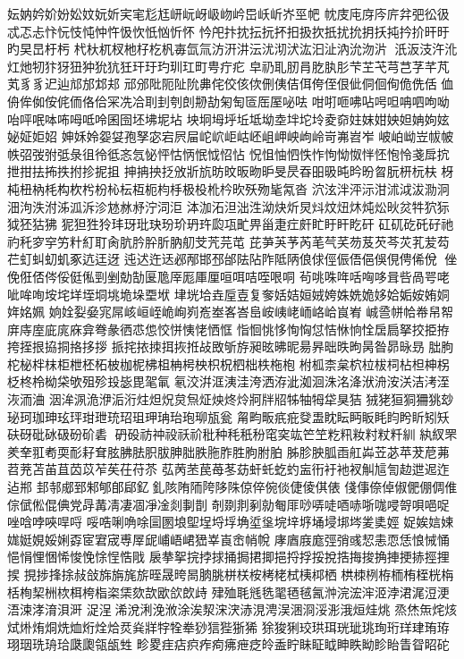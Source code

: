 妘妠妗妎妢妐妏妧妡宎宒尨尪岍岏岈岋岉岒岊岆岓岕巠帊
帎庋庉庌庈庍弅弝彸彶忒忑忐忭忨忮忳忡忤忣忺忯忷忻怀
忴戺抃抌抎抏抔抇扱扻扺扰抁抈扷扽扲扴旰旴旳旲旵杅杇
杙杕杌杈杝杍杚杋毐氙氚汸汧汫沄沋沏汱汯汩沚汭沇沕沜
汦汳汥汻沎灴灺牣犿犽狃狆狁犺狅玕玗玓玔玒町甹疔疕
皁礽耴肕肙肐肒肜芐芏芅芎芑芓芊芃芄⾘豸迉辿邟邡邥邞
邧邠阰阨阯阭丳侘佼侅佽侀侇佶佴侉侄佷佌侗佪侚佹侁佸
侐侜侔侞侒侂侕佫佮冞冼冾刵刲刳剆刱劼匊匋匼厒厔咇呿
咁咑咂咈呫呺呾呥呬呴呦咍呯呡呠咘呣呧呤囷囹坯坲坭坫
坱坰坶垀坵坻坳坴坢坨坽夌奅妵妺姏姎妲姌姁妶妼姃姖妱
妽姀姈妴姇孢孥宓宕屄屇岮岤岠岵岯岨岬岟岣岭岢岪岧岝
岥岶岰岦帗帔帙弨弢弣弤彔徂彾彽忞忥怭怦怙怲怋怴怊怗
怳怚怞怬怢怍怐怮怓怑怌怉怜戔戽抭抴拑抾抪抶拊抮抳抯
抻抩抰抸攽斨斻昉旼昄昒昈旻昃昋昍昅旽昑昐曶朊枅杬枎
枒杶杻枘枆构杴枍枌杺枟枑枙枃杽极杸杹枔欥殀歾毞氝沓
泬泫泮泙沶泔沭泧沷泐泂沺泃泆泭泲泒泝沴沊沝沀泞泀洰
泍泇沰泹泏泩泑炔炘炅炓炆炄炑炖炂炚炃牪狖狋狘狉狜狒
狔狚狌狑玤玡玭玦玢玠玬玝瓝瓨甿畀甾疌疘皯盳盱盰盵矸
矼矹矻矺矷祂礿秅穸穻竻籵糽耵肏肮肣肸肵肭舠芠苀芫芚
芘芛芵芧芮芼芞芺芴芨芡芩苂芤苃芶芢虰虯虭虮豖迒迋迓
迍迖迕迗邲邴邯邳邰阹阽阼阺陃俍俅俓侲俉俋俁俔俜俙侻
侳俛俇俖侺俀侹俬剄剉勀勂匽卼厗厖厙厘咺咡咭咥哏哃
茍咷咮哖咶哅哆咠呰咼咢咾呲哞咰垵垞垟垤垌垗垝垛垔垘
垏垙垥垚垕壴复奓姡姞姮娀姱姝姺姽姼姶姤姲姷姛姩姳姵
姠姾姴姭宨屌峐峘峌峗峋峛峞峚峉峇峊峖峓峔峏峈峆峎峟
峸巹帡帢帣帠帤庰庤庢庛庣庥弇弮彖徆怷怹恔恲恞恅恓恇
恉恛恌恀恂恟怤恄恘恦恮扂扃拏挍挋拵挎挃拫拹挏挌拸拶
挀挓挔拺挕拻拰敁敃斪斿昶昡昲昵昜昦昢昳昫昺昝昴昹昮
朏朐柁柲柈枺柜枻柸柘柀枷柅柫柤柟枵柍枳柷柶柮柣柂枹
柎柧柰枲柼柆柭柌枮柦柛柺柉柊柃柪柋欨殂殄殶毖毘毠氠
氡洨洴洭洟洼洿洒洊泚洳洄洙洺洚洑洀洝浂洁洘洷洃洏浀
洇洠洬洈洢洉洐炷炟炾炱炰炡炴炵炩牁牉牊牬牰牳牮狊狤
狨狫狟狪狦狣玅珌珂珈珅玹玶玵玴珫玿珇玾珃珆玸珋瓬瓮
甮畇畈疧疪癹盄眈眃眄眅眊盷盻盺矧矨砆砑砒砅砐砏砎砉
砃砓祊祌祋祅祄秕种秏秖秎窀穾竑笀笁籺籸籹籿粀粁紃
紈紁罘羑羍羾耇耎耏耔耷胘胇胠胑胈胂胐胅胣胙胜胊胕胉
胏胗胦胍臿舡芔苙苾苹茇苨茀苕茺苫苖苴苬苡苲苵茌苻苶
苰苪苤苠苺苳苭虷虴虼虳衁衎衧衪衩觓訄訇赲迣迡迮迠郱
邽邿郕郅邾郇郋郈釔釓陔陏陑陓陊陎倞倅倇倓倢倰倛俵
俴倳倷倬俶俷倗倜倠倧倵倯倱倎党冔冓凊凄凅凈凎剡剚剒
剞剟剕剢勍匎厞唦哢唗唒哧哳哤唚哿唄唈哫唑唅哱唊哻哷
哸哠唎唃唋圁圂埌堲埕埒垺埆垽垼垸垶垿埇埐垹埁夎奊娙
娖娭娮娕娏娗娊娞娳孬宧宭宬尃屖屔峬峿峮峱峷崀峹帩帨
庨庮庪庬弳弰彧恝恚恧恁悢悈悀悒悁悝悃悕悛悗悇悜悎戙
扆拲挐捖挬捄捅挶捃揤挹捋捊挼挩捁挴捘捔捙挭捇挳捚捑
挸捗捀捈敊敆旆旃旄旂晊晟晇晑朒朓栟栚桉栲栳栻桋桏栖
栱栜栵栫栭栯桎桄栴栝栒栔栦栨栮桍栺栥栠欬欯欭欱欴歭
肂殈毦毤毨毣毢毧氥浺浣浤浶洍浡涒浘浢浭浯涑涍淯浿涆
浞浧浠涗浰浼浟涂涘洯浨涋浾涀涄洖涃浻浽浵涐烜烓烑
烝烋缹烢烗烒烞烠烔烍烅烆烇烚烎烡牂牸牷牶猀狺狴狾狶
狳狻猁珓珙珥珖玼珧珣珩珜珒珛珔珝珚珗珘珨瓞瓟瓴瓵甡
畛畟疰痁疻痄痀疿疶疺皊盉眝眛眐眓眒眣眑眕眙眚眢眧砣
